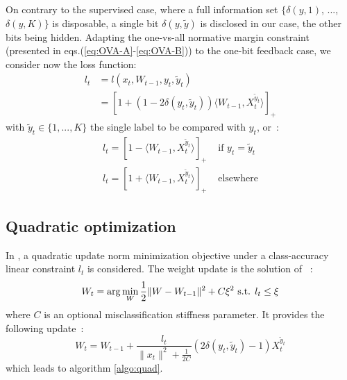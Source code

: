 \documentclass[preprint,12pt,authoryear]{elsarticle}
\begin{document}
On contrary to the supervised case, where a full information set $\{\delta(y,1)$, ..., $\delta(y,K)\}$ is disposable, a single bit $\delta(y,\tilde{y})$ is disclosed in our case, the other bits being hidden. 
Adapting the one-vs-all normative margin constraint (presented in eqs.(\ref{eq:OVA-A}-\ref{eq:OVA-B})) to the one-bit feedback case, we consider now the loss function:
\begin{align}\label{eq:loss}
l_t &= l(x_t,W_{t-1},y_t,\tilde{y}_t)\nonumber\\
&= [1 + (1 - 2 \delta(y_t,\tilde{y}_t)) \langle W_{t-1}, X_t^{\tilde{y}_t}\rangle]_+
\end{align}
with $\tilde{y}_t \in \{1,...,K\}$ the single label to be compared with $y_t$, or~:
\begin{align}
l_t = [1 - \langle W_{t-1}, X_t^{\tilde{y}_t}\rangle]_+ &\text{ if }y_t=\tilde{y}_t\label{eq:loss-A}\\
l_t = [1 + \langle W_{t-1}, X_t^{\tilde{y}_t}\rangle]_+ &\text{ elsewhere} \label{eq:loss-B}
\end{align}




{\color{blue} }

\subsection{Quadratic optimization}
 
In \cite{crammer2006online}, a quadratic update norm minimization objective under a class-accuracy linear constraint $ l_t $ is considered.  
The weight update is the solution of ~:
$$W_{t} = \arg \min_W \frac{1}{2} \| W - W_{t-1}\|^2 + C \xi^2 \hbox{ s.t. } l_t \leq \xi$$
where $C$ is an optional misclassification stiffness parameter. It provides the following update~:
$$W_{t} =  W_{t-1} + \frac{l_t}{\|x_t\|^2 + \frac{1}{2C}} (2\delta(y_t,\tilde{y}_t) - 1) X_t^{\tilde{y}_t}$$
which leads to algorithm \ref{algo:quad}.
\end{document}
